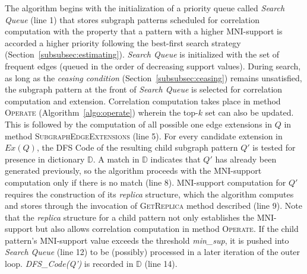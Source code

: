 {The algorithm begins with the initialization of a priority queue called
\textit{Search Queue} (line 1) that stores subgraph patterns scheduled for
correlation computation with the property that a pattern with a higher
MNI-support is accorded a higher priority following the best-first search
strategy (Section~\ref{subsubsec:estimating}). \textit{Search Queue} is
initialized with the set of frequent edges (queued in the order of decreasing
support values). During search, as long as the \textit{ceasing condition}
(Section~\ref{subsubsec:ceasing}) remains unsatisfied, the subgraph pattern at
the front of \textit{Search Queue} is selected for correlation computation and
extension. Correlation computation takes place in method \textsc{Operate}
(Algorithm~\ref{algo:operate}) wherein the top-$k$ set can also be
updated. This is followed by the computation of all possible one edge extensions
in $Q$ in method \textsc{SubgraphEdgeExtensions} (line 5). For every candidate
extension in $Ex(Q)$, the DFS Code of the resulting child subgraph pattern $Q'$
is tested for presence in dictionary $\mathbb{D}$. A match in $\mathbb{D}$
indicates that $Q'$ has already been generated previously, so the algorithm
proceeds with the MNI-support computation only if there is no match (line 8).
MNI-support computation for $Q'$ requires the construction of its \textit{replica}
structure, which the algorithm computes and stores through the invocation of
\textsc{GetReplica} method described (line 9). Note that the \textit{replica} structure
for a child pattern not only establishes the MNI-support but also allows
correlation computation in method \textsc{Operate}. If the child pattern's
MNI-support value exceeds the threshold \textit{min\_sup}, it is pushed into
\textit{Search Queue} (line 12) to be (possibly) processed in a later iteration of
the outer loop. \textit{DFS\_Code(Q')} is recorded in $\mathbb{D}$ (line 14).

}
